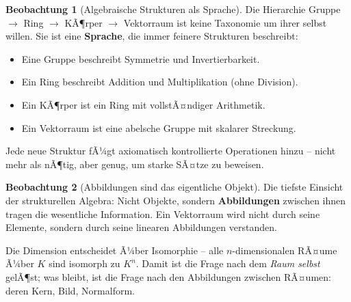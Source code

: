 ﻿\documentclass[a4paper,12pt]{report}
\theoremstyle{definition}
\newtheorem{beobachtung}{Beobachtung}
\begin{document}
\begin{beobachtung}[Algebraische Strukturen als Sprache]
    Die Hierarchie Gruppe $\to$ Ring $\to$ KÃ¶rper $\to$ Vektorraum ist keine
    Taxonomie um ihrer selbst willen. Sie ist eine \textbf{Sprache}, die
    immer feinere Strukturen beschreibt:
    \begin{itemize}
        \item[-] Eine Gruppe beschreibt Symmetrie und Invertierbarkeit.
        \item[-] Ein Ring beschreibt Addition und Multiplikation (ohne Division).
        \item[-] Ein KÃ¶rper ist ein Ring mit vollstÃ¤ndiger Arithmetik.
        \item[-] Ein Vektorraum ist eine abelsche Gruppe mit skalarer Streckung.
    \end{itemize}
    Jede neue Struktur fÃ¼gt axiomatisch kontrollierte Operationen hinzu --
    nicht mehr als nÃ¶tig, aber genug, um starke SÃ¤tze zu beweisen.
\end{beobachtung}

\begin{beobachtung}[Abbildungen sind das eigentliche Objekt]
    Die tiefste Einsicht der strukturellen Algebra: Nicht Objekte, sondern
    \textbf{Abbildungen} zwischen ihnen tragen die wesentliche Information.
    Ein Vektorraum wird nicht durch seine Elemente, sondern durch seine
    linearen Abbildungen verstanden.

    Die Dimension entscheidet Ã¼ber Isomorphie -- alle $n$-dimensionalen
    RÃ¤ume Ã¼ber $K$ sind isomorph zu $K^n$. Damit ist die Frage nach dem
    \emph{Raum selbst} gelÃ¶st; was bleibt, ist die Frage nach den
    Abbildungen zwischen RÃ¤umen: deren Kern, Bild, Normalform.
\end{beobachtung}
\end{document}
